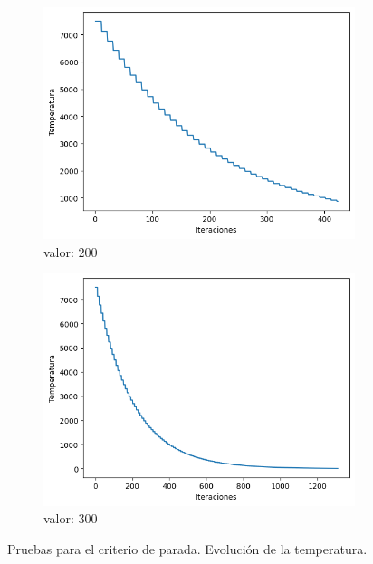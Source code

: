 \documentclass[a4paper,12pt]{article}
\begin{document}
\begin{figure}[H]
		\hfill
		\begin{subfigure}{0.24\textwidth}
			\centering
			\includegraphics[width=\textwidth]{include/parada/200/temp.png}
			\caption{valor: $200$}
		\end{subfigure}
		\hfill
		\begin{subfigure}{0.24\textwidth}
			\centering
			\includegraphics[width=\textwidth]{include/parada/300/temp.png}
			\caption{valor: $300$}
		\end{subfigure}
		\caption{Pruebas para el criterio de parada. Evolución de la temperatura.}
	\end{figure}
	
\end{document}
